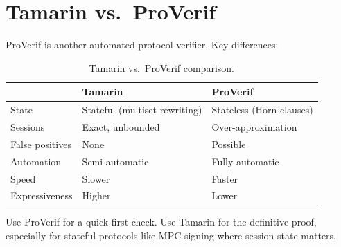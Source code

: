 \section{Tamarin vs.\ ProVerif}


ProVerif is another automated protocol verifier. Key differences:

\begin{table}[H]
\centering
\small
\begin{tabular}{@{}lll@{}}
\toprule
 & \textbf{Tamarin} & \textbf{ProVerif} \\
\midrule
State & Stateful (multiset rewriting) & Stateless (Horn clauses) \\
Sessions & Exact, unbounded & Over-approximation \\
False positives & None & Possible \\
Automation & Semi-automatic & Fully automatic \\
Speed & Slower & Faster \\
Expressiveness & Higher & Lower \\
\bottomrule
\end{tabular}
\caption{Tamarin vs.\ ProVerif comparison.}
\end{table}

Use ProVerif for a quick first check. Use Tamarin for the definitive proof, especially
for stateful protocols like MPC signing where session state matters.

